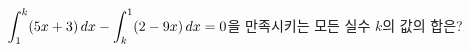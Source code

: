 $\displaystyle\int_{1}^{k} (5x+3)\mkern3mu dx-\int_{k}^{1} (2-9x)\mkern3mu dx=0$을 만족시키는 모든 실수 $k$의 값의 합은?
